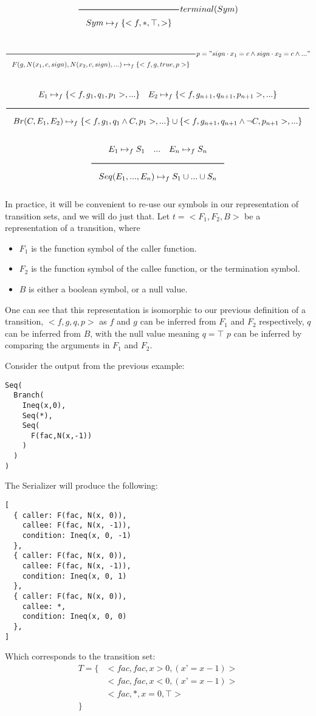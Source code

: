 \[
\Rule{}
{Sym \mapsto_f \{<f,*,\top, >\}}
terminal(Sym)
\]
\[
\Rule{}
     {F(g,N(x_1,c,sign),N(x_2,c,sign),...) \mapsto_f \{<f,g,true,p>\}}
p = "sign\cdot x_1=c\land sign\cdot x_2=c \land ..."
\]

\[
\Rule{E_1 \mapsto_f \{<f,g_1,q_1,p_1>,...\} \quad  E_2 \mapsto_f \{<f,g_{n+1},q_{n+1},p_{n+1}>,...\}}
     {Br(C,E_1,E_2) \mapsto_f \{<f,g_1,q_1\land C,p_1>,...\} \cup \{<f,g_{n+1},q_{n+1}\land\neg C,p_{n+1}>,...\}}
\]
\[
\Rule{E_1 \mapsto_f S_1 \quad ... \quad E_n \mapsto_f S_n}
     {Seq(E_1,...,E_n) \mapsto_f S_1 \cup ... \cup S_n}
\]

In practice, it will be convenient to re-use our symbols in our representation of transition sets,
and we will do just that. Let $t = < F_1, F_2, B >$ be a representation of a transition, where


\begin{itemize}
\item $F_1$ is the function symbol of the caller function.
\item $F_2$ is the function symbol of the callee function, or the termination symbol.
\item $B$ is either a boolean symbol, or a null value.
\end{itemize}

One can see that this representation is isomorphic to our previous definition of a transition,
$<f, g, q, p>$ as $f$ and $g$ can be inferred from $F_1$ and $F_2$ respectively,
$q$ can be inferred from $B$, with the null value meaning $q = \top$
$p$ can be inferred by comparing the arguments in $F_1$ and $F_2$.

\begin{example}
  Consider the output from the previous example:
\begin{lstlisting}
Seq(
  Branch(
    Ineq(x,0),
    Seq(*),
    Seq(
      F(fac,N(x,-1))
    )
  )
)
\end{lstlisting}

  \noindent
  The Serializer will produce the following:
\begin{lstlisting}
[
  { caller: F(fac, N(x, 0)),
    callee: F(fac, N(x, -1)),
    condition: Ineq(x, 0, -1)
  },
  { caller: F(fac, N(x, 0)),
    callee: F(fac, N(x, -1)),
    condition: Ineq(x, 0, 1)
  },
  { caller: F(fac, N(x, 0)),
    callee: *,
    condition: Ineq(x, 0, 0)
  },
]
\end{lstlisting}

  \noindent
  Which corresponds to the transition set:
\[
\begin{aligned}
  T = \{ & < fac, fac, x > 0, (x’=x-1) > \\
 & < fac, fac, x < 0, (x’=x-1) > \\
 & < fac, *, x = 0, \top > \\
\}
\end{aligned}
\]
  
\end{example}


